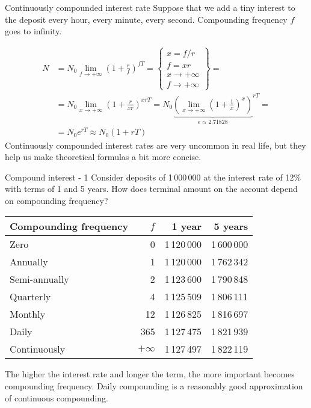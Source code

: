 \documentclass{beamer}
\begin{document}
\begin{frame}{Continuously compounded interest rate}
\justify
Suppose that we add a tiny interest to the deposit every hour, every minute, every second. Compounding frequency $f$ goes to infinity.

\begin{align*}
N &= N_0 \lim_{f \to +\infty} \left(1 + \frac{r}{f}\right)^{fT} = 
\begin{Bmatrix}x= f/r \\ f=xr \\ x \to +\infty \\ f \to +\infty\end{Bmatrix} = \\
&= N_0\lim_{x \to +\infty} \left(1 + \frac{r}{xr}\right) ^ {xrT} =
N_0{\underbrace{\left(\lim_{x \to +\infty} \left( 1 + \frac{1}{x} \right) ^ x\right)}_{e \approx 2.71828}}  ^ {rT} = \\
&= N_0e^{rT} \approx N_0(1 + rT)
\end{align*}
Continuously compounded interest rates are very uncommon in real life, but they help us make theoretical formulas a bit more concise.
\end{frame}



\begin{frame}{Compound interest  - 1}
\justify
Consider deposits of 1\,000\,000 at the interest rate of 12\% with terms of 1 and 5 years. How does terminal amount on the account depend on compounding frequency?


\begin{table}
\centering
\begin{tabular}{l|r|r|r}
Compounding frequency & $f$ & 1 year & 5 years \\ \hline
Zero & 0         & 1\,120\,000 & 1\,600\,000 \\
Annually          & 1         & 1\,120\,000 & 1\,762\,342 \\
Semi-annually     & 2         & 1\,123\,600 & 1\,790\,848 \\
Quarterly     & 4         & 1\,125\,509 & 1\,806\,111 \\
Monthly        & 12        & 1\,126\,825 & 1\,816\,697 \\
Daily         & 365       & 1\,127\,475 & 1\,821\,939 \\
Continuously        & $+\infty$ & 1\,127\,497 & 1\,822\,119
\end{tabular}
\end{table}

\justifying
The higher the interest rate and longer the term, the more important becomes compounding frequency. Daily compounding is a reasonably good  approximation of continuous compounding.
\end{frame}
\end{document}
